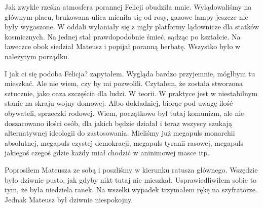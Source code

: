 Jak zwykle rześka atmosfera porannej Felicji obudziła mnie. 
Wylądowaliśmy na głównym placu, brukowana ulica mieniła się od rosy, gazowe lampy jeszcze nie były wygaszone.
W oddali wyłaniały się z mgły platformy lądownicze dla statków kosmicznych. Na jednej stał prawdopodobnie śmieć, sądząc po kształcie.
Na ławeczce obok siedział Mateusz i popijał poranną herbatę. 
Wszystko było w należytym porządku.
\begin{dialogue}
\ds{} I jak ci się podoba Felicja? \dm{} zapytałem.
\ds{} Wygląda bardzo przyjemnie, mógłbym tu mieszkać. Ale nie wiem, czy by mi pozwolili. Czytałem, że została stworzona sztucznie, jako oaza szczęścia dla ludzi.
\ds{} W teorii. W praktyce jest w niestabilnym stanie na skraju wojny domowej. Albo dokładniej, biorąc pod uwagę ilość obywateli, sprzeczki rodowej.
\ds{} Wiem, początkowo był tutaj komunizm, ale nie doszacowano ilości osób, dla jakich będzie działał i teraz wszyscy szukają alternatywnej ideologii do zastosowania.
\ds{} Mieliśmy już megapuls monarchii absolutnej, megapuls czystej demokracji, megapuls tyranii rasowej, megapuls jakiegoś czegoś gdzie każdy miał chodzić w aninimowej masce itp.
\end{dialogue}

Poprosiłem Mateusza ze sobą i poszliśmy w kierunku ratusza głównego.
Wszędzie było dziwnie pusto, jak gdyby nikt tutaj nie mieszkał. 
Usprawiedliwiłem sobie to tym, że była niedziela ranek.
Na wszelki wypadek trzymałem rękę na szyfratorze.
Jednak Mateusz był dziwnie niespokojny.

